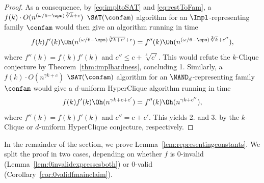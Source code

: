 \begin{proof}
%
As a consequence, by \eqref{eq:impltoSAT} and \eqref{eq:restToFam}, a $f(k) \cdot O(n^{(\omega/6-\eps)\sqrt[3]{k}+c})$ $\SAT(\confam)$ algorithm for an $\Impl$-representing family $\confam$ would then give an \Implication algorithm running in time  
\[f(k) f'(k) \Oh(n^{(\omega/6-\eps)\sqrt[3]{k+c'}+c})= f''(k) \Oh(n^{(\omega/6-\eps)\sqrt[3]{k}+c''}),\]
where $f''(k) = f(k) f'(k)$ and $c'' \le c+\sqrt[3]{c'}$. This would refute the $k$-Clique conjecture by Theorem~\ref{thm:implhardness}, concluding 1.
%
Similarly, a $f(k) \cdot O(n^{\gamma k+c})$ $\SAT(\confam)$ algorithm for an $\NAND_d$-representing family $\confam$ would give a $d$-uniform HyperClique algorithm running in time  
\[f(k) f'(k) \Oh(n^{\gamma k+c+c'})= f''(k) \Oh(n^{\gamma k +c''}),\]
where $f''(k) = f(k) f'(k)$ and $c'' = c+c'$. This yields 2. and 3. by the $k$-Clique or $d$-uniform HyperClique conjecture, respectively.
\end{proof}
%
In the remainder of the section, we prove Lemma~\ref{lem:representingconstants}. We split the proof in two cases, depending on whether $f$ is 0-invalid (Lemma~\ref{lem:0invalidexpressesboth}) or 0-valid (Corollary~\ref{cor:0validfmainclaim}).
%
